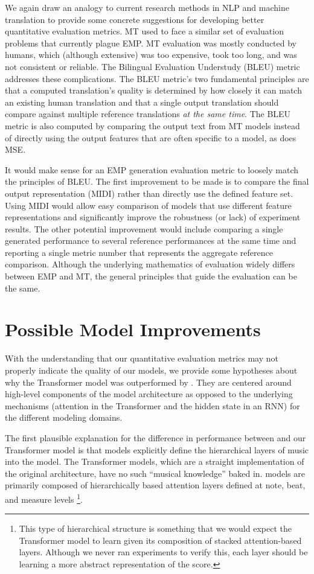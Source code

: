 We again draw an analogy to current research methods in NLP and machine translation to provide some concrete suggestions for developing better quantitative evaluation metrics. MT used to face a similar set of evaluation problems that currently plague EMP. MT evaluation was mostly conducted by humans, which (although extensive) was too expensive, took too long, and was not consistent or reliable. The Bilingual Evaluation Understudy (BLEU) metric~\cite{papineni2002bleu} addresses these complications. The BLEU metric's two fundamental principles are that a computed translation's quality is determined by how closely it can match an existing human translation and that a single output translation should compare against multiple reference translations \emph{at the same time}. The BLEU metric is also computed by comparing the output text from MT models instead of directly using the output features that are often specific to a model, as does MSE. 

It would make sense for an EMP generation evaluation metric to loosely match the principles of BLEU. The first improvement to be made is to compare the final output representation (MIDI) rather than directly use the defined feature set. Using MIDI would allow easy comparison of models that use different feature representations and significantly improve the robustness (or lack) of experiment results. The other potential improvement would include comparing a single generated performance to several reference performances at the same time and reporting a single metric number that represents the aggregate reference comparison. Although the underlying mathematics of evaluation widely differs between EMP and MT, the general principles that guide the evaluation can be the same. 

\section{Possible Model Improvements}
With the understanding that our quantitative evaluation metrics may not properly indicate the quality of our models, we provide some hypotheses about why the Transformer model was outperformed by \vnet{}. They are centered around high-level components of the model architecture as opposed to the underlying mechanisms (attention in the Transformer and the hidden state in an RNN) for the different modeling domains. 

The first plausible explanation for the difference in performance between \vnet{} and our Transformer model is that \vnet{} models explicitly define the hierarchical layers of music into the model. The Transformer models, which are a straight implementation of the original architecture, have no such ``musical knowledge'' baked in. \vnet{} models are primarily composed of hierarchically based attention layers defined at note, beat, and measure levels%
\footnote{This type of hierarchical structure is something that we would expect the Transformer model to learn given its composition of stacked attention-based layers. Although we never ran experiments to verify this, each layer should be learning a more abstract representation of the score.}. 

